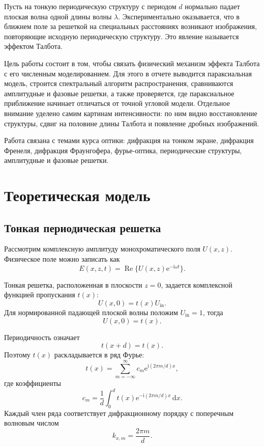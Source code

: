 \documentclass[12pt,a4paper]{article}
\newcommand{\dd}{\,\mathrm{d}}
\newcommand{\ii}{\mathrm{i}}
\newcommand{\e}{\mathrm{e}}
\begin{document}
Пусть на тонкую периодическую структуру с периодом $d$ нормально падает плоская волна одной длины волны $\lambda$. Экспериментально оказывается, что в ближнем поле за решеткой на специальных расстояниях возникают изображения, повторяющие исходную периодическую структуру. Это явление называется эффектом Талбота.

Цель работы состоит в том, чтобы связать физический механизм эффекта Талбота с его численным моделированием. Для этого в отчете выводится параксиальная модель, строится спектральный алгоритм распространения, сравниваются амплитудные и фазовые решетки, а также проверяется, где параксиальное приближение начинает отличаться от точной угловой модели. Отдельное внимание уделено самим картинам интенсивности: по ним видно восстановление структуры, сдвиг на половине длины Талбота и появление дробных изображений.

Работа связана с темами курса оптики: дифракция на тонком экране, дифракция Френеля, дифракция Фраунгофера, фурье-оптика, периодические структуры, амплитудные и фазовые решетки.

\section{Теоретическая модель}

\subsection{Тонкая периодическая решетка}

Рассмотрим комплексную амплитуду монохроматического поля $U(x,z)$. Физическое поле можно записать как
\begin{equation}
    E(x,z,t)=\operatorname{Re}\{U(x,z)\e^{-\ii\omega t}\}.
\end{equation}

Тонкая решетка, расположенная в плоскости $z=0$, задается комплексной функцией пропускания $t(x)$:
\begin{equation}
    U(x,0)=t(x)U_{\mathrm{in}}.
\end{equation}
Для нормированной падающей плоской волны положим $U_{\mathrm{in}}=1$, тогда
\begin{equation}
    U(x,0)=t(x).
\end{equation}

Периодичность означает
\begin{equation}
    t(x+d)=t(x).
\end{equation}
Поэтому $t(x)$ раскладывается в ряд Фурье:
\begin{equation}
    t(x)=\sum_{m=-\infty}^{\infty} c_m
    \e^{\ii(2\pi m/d)x},
    \label{eq:fourier_series}
\end{equation}
где коэффициенты
\begin{equation}
    c_m=\frac{1}{d}\int_0^d t(x)
    \e^{-\ii(2\pi m/d)x}\dd x.
\end{equation}
Каждый член ряда соответствует дифракционному порядку с поперечным волновым числом
\begin{equation}
    k_{x,m}=\frac{2\pi m}{d}.
\end{equation}
\end{document}
